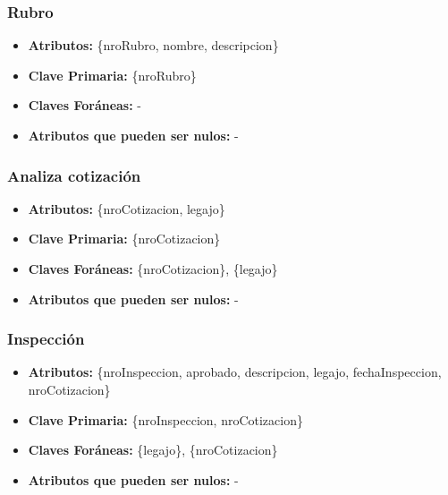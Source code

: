 \documentclass[a4paper,11pt]{article}
\begin{document}
\subsubsection{Rubro}

\begin{itemize}

	\item \textbf{Atributos:} \{nroRubro, nombre, descripcion\}
	
	\item \textbf{Clave Primaria:} \{nroRubro\}
	
	\item \textbf{Claves Foráneas:} -

	\item \textbf{Atributos que pueden ser nulos:} -
	
\end{itemize}

\subsubsection{Analiza cotización}

\begin{itemize}

	\item \textbf{Atributos:} \{nroCotizacion, legajo\}
	
	\item \textbf{Clave Primaria:} \{nroCotizacion\}
	
	\item \textbf{Claves Foráneas:} \{nroCotizacion\}, \{legajo\}

	\item \textbf{Atributos que pueden ser nulos:} -
	
\end{itemize}

\subsubsection{Inspección}

\begin{itemize}

	\item \textbf{Atributos:} \{nroInspeccion, aprobado, descripcion, legajo, fechaInspeccion, nroCotizacion\}
	
	\item \textbf{Clave Primaria:} \{nroInspeccion, nroCotizacion\}
	
	\item \textbf{Claves Foráneas:} \{legajo\}, \{nroCotizacion\}

	\item \textbf{Atributos que pueden ser nulos:} -
	
\end{itemize}
\end{document}
